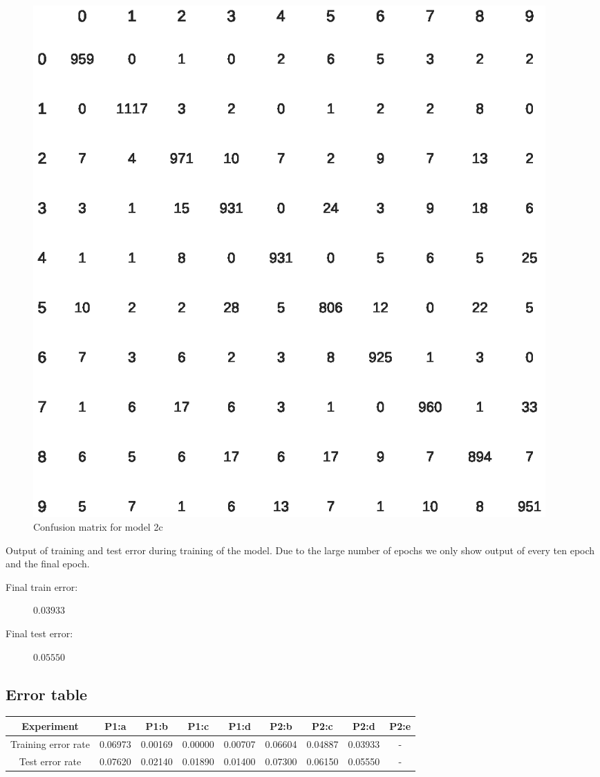 \documentclass{article}
\begin{document}
\begin{figure}[H]
  \centering
  \includegraphics[width=0.95\textwidth]{model_2c_confusion_matrix.eps}
  \caption{Confusion matrix for model 2c}
  \label{fig:conf_2c}
\end{figure}

Output of training and test error during training of the model. Due to the large
number of epochs we only show output of every ten epoch and the final epoch.



\begin{description}
\item[Final train error:] $0.03933$
\item[Final test error:] $0.05550$
\end{description}

\newpage

\subsection{Error table}

\begin{center}
  \begin{tabular}{ |c|c|c|c|c|c|c|c|c| } 
    \hline
    Experiment & P1:a & P1:b & P1:c & P1:d & P2:b & P2:c & P2:d & P2:e \\
    \hline
    Training error rate & 0.06973 & 0.00169 & 0.00000 & 0.00707 & 0.06604 & 0.04887 & 0.03933 & -\\ 
    Test error rate & 0.07620 & 0.02140 & 0.01890 & 0.01400 & 0.07300 & 0.06150 & 0.05550 & - \\ 
    \hline
  \end{tabular}
\end{center}
\end{document}
